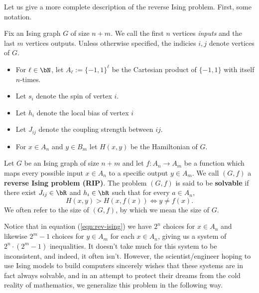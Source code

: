 Let us give a more complete description of the reverse Ising problem. First, some notation.
\begin{notation}\label{not:rev-ising-problem}
	Fix an Ising graph $G$ of size $n+m$. We call the first $n$ vertices \emph{inputs} and the last $m$ vertices outputs. Unless otherwise specified, the indicies $i,j$ denote vertices of $G$.
	\begin{itemize}
		\item For $\ell \in \bN$, let $A_\ell := \{-1,1\}^\ell$ be the Cartesian product of $\{-1,1\}$ with itself $n$-times.
		\item Let $s_i$ denote the spin of vertex $i$.
		\item Let $h_i$ denote the local bias of vertex $i$
		\item Let $J_{ij}$ denote the coupling strength between $ij$.
		\item For $x\in A_n$ and $y \in B_m$ let $H(x,y)$ be the Hamiltonian of $G$.
	\end{itemize}
\end{notation}
\begin{problem}\label{prob:fixed-rev-ising}
    Let $G$ be an Ising graph of size $n+m$ and let $f:A_n\to A_m$ be a function which maps every possible input $x \in A_n$ to a specific output $y \in A_m$. We call $(G,f)$ a \textbf{reverse Ising problem (RIP)}. The problem $(G,f)$ is said to be \textbf{solvable} if there exist $J_{ij} \in \bR$ and $h_i \in \bR$ such that for every $a \in A_n$,
	\begin{equation}\label{eqn:rev-ising}
		H(x,y) > H(x,f(x)) \iff y \neq f(x).
	\end{equation}
	We often refer to the size of $(G,f)$, by which we mean the size of $G$.
\end{problem}
Notice that in equation (\ref{eqn:rev-ising}) we have $2^n$ choices for $x \in A_n$ and likewise $2^m - 1$ choices for $y \in A_m$ for each $x \in A_n$, giving us a system of $2^n\cdot (2^m - 1)$ inequalities. It doesn't take much for this system to be inconsistent, and indeed, it often isn't. However, the scientist/engineer hoping to use Ising models to build computers sincerely wishes that these systems are in fact always solvable, and in an attempt to protect their dreams from the cold reality of mathematics, we generalize this problem in the following way.

